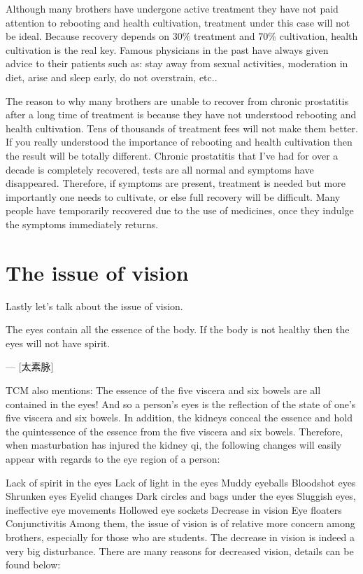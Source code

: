 \documentclass[
]{book}
\begin{document}
Although many brothers have undergone active treatment they have not paid attention to rebooting and health cultivation, treatment under this case will not be ideal. Because recovery depends on 30\% treatment and 70\% cultivation, health cultivation is the real key. Famous physicians in the past have always given advice to their patients such as: stay away from sexual activities, moderation in diet, arise and sleep early, do not overstrain, etc..

The reason to why many brothers are unable to recover from chronic prostatitis after a long time of treatment is because they have not understood rebooting and health cultivation. Tens of thousands of treatment fees will not make them better. If you really understood the importance of rebooting and health cultivation then the result will be totally different. Chronic prostatitis that I've had for over a decade is completely recovered, tests are all normal and symptoms have disappeared. Therefore, if symptoms are present, treatment is needed but more importantly one needs to cultivate, or else full recovery will be difficult. Many people have temporarily recovered due to the use of medicines, once they indulge the symptoms immediately returns.

\hypertarget{the-issue-of-vision}{%
\section{The issue of vision}\label{the-issue-of-vision}}

Lastly let's talk about the issue of vision.

The eyes contain all the essence of the body. If the body is not healthy then the eyes will not have spirit.

--- {[}太素脉{]}

TCM also mentions: The essence of the five viscera and six bowels are all contained in the eyes! And so a person's eyes is the reflection of the state of one's five viscera and six bowels. In addition, the kidneys conceal the essence and hold the quintessence of the essence from the five viscera and six bowels. Therefore, when masturbation has injured the kidney qi, the following changes will easily appear with regards to the eye region of a person:

Lack of spirit in the eyes
Lack of light in the eyes
Muddy eyeballs
Bloodshot eyes
Shrunken eyes
Eyelid changes
Dark circles and bags under the eyes
Sluggish eyes, ineffective eye movements
Hollowed eye sockets
Decrease in vision
Eye floaters
Conjunctivitis
Among them, the issue of vision is of relative more concern among brothers, especially for those who are students. The decrease in vision is indeed a very big disturbance. There are many reasons for decreased vision, details can be found below:
\end{document}
